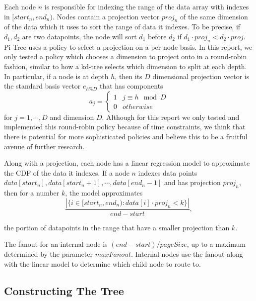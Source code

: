\documentclass[sigconf,10pt]{acmart}
\begin{document}
Each node $n$ is responsible for indexing the range of the data array with indexes in $[start_n, end_n)$.
Nodes contain a projection vector $proj_n$ of the same dimension of the data
which it uses to sort the range of data it indexes. 
To be precise, if $d_1, d_2$ are two datapoints, the node will 
sort $d_1$ before $d_2$ if $d_1 \cdot proj_n < d_2 \cdot proj$.
Pi-Tree uses a policy to select a projection on a per-node basis. In this report,
we only tested a policy which chooses a dimension to project onto in a round-robin
fashion, similar to how a kd-tree selects which dimension to split at each depth.
In particular, if a node is at depth $h$, then its
$D$ dimensional projection vector is the standard basis vector $e_{h \% D}$ that has components 
$$a_j = \begin{cases} 
  1 & j \equiv h \mod D \\
  0 & otherwise
\end{cases}
$$
for $j=1, \cdots, D$ and dimension $D$. Although for this report we only 
tested and implemented this round-robin policy because of time constraints,
we think that there is potential
for more sophisticated policies and believe this to be a fruitful avenue of further
research.

Along with a projection, each node has a linear regression model 
to approximate the CDF of the data it indexes. If a node $n$ indexes data points
$data[start_n], data[start_n + 1], \cdots, data[end_n - 1]$ and has projection $proj_n$,
then for a number $k$, the
model approximates
\[ 
  \frac{|\{i \in [start_n, end_n) : data[i] \cdot proj_n < k\}|}{end - start},
\]

the portion of datapoints in the range that have a 
smaller projection than $k$.

The fanout for an internal node is $(end - start) / pageSize$, up to a maximum determined
by the parameter $maxFanout$. Internal nodes use the fanout along with the linear model
to determine which child node to route to.

\subsection{Constructing The Tree}
\end{document}
